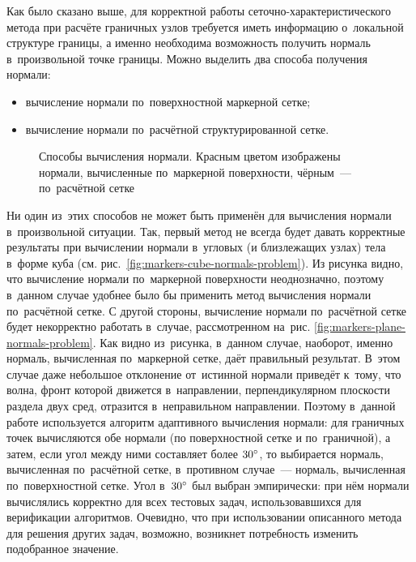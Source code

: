 \documentclass[thesis.tex]{subfiles}
\begin{document}
    Как было сказано выше, для корректной работы сеточно-характерис\-ти\-чес\-ко\-го метода при расчёте граничных узлов требуется
    иметь информацию о~локальной структуре границы, а именно необходима возможность получить нормаль в~произвольной точке
    границы. Можно выделить два способа получения нормали:

    \begin{itemize}
        \item вычисление нормали по~поверхностной маркерной сетке;
        \item вычисление нормали по~расчётной структурированной сетке.
    \end{itemize}

    \begin{figure}[t!]
        \centering
        \caption{Способы вычисления нормали. Красным цветом изображены нормали, вычисленные по~маркерной
                 поверхности, чёрным~--- по~расчётной сетке}
        \label{fig:markers-normals-problem}
    \end{figure}

    \newpage
    Ни один из~этих способов не может быть применён для вычисления нормали в~произвольной ситуации. Так, первый метод не
    всегда будет давать корректные результаты при вычислении нормали в~угловых (и близлежащих узлах) тела в~форме куба
    (см. рис.~\ref{fig:markers-cube-normals-problem}). Из рисунка видно, что вычисление нормали по~маркерной поверхности
    неоднозначно, поэтому в~данном случае удобнее было бы применить метод вычисления нормали по~расчётной сетке. С
    другой стороны, вычисление нормали по~расчётной сетке будет некорректно работать в~случае, рассмотренном на~рис.
    \ref{fig:markers-plane-normals-problem}. Как видно из~рисунка, в~данном случае, наоборот, именно нормаль,
    вычисленная по~маркерной сетке, даёт правильный результат. В~этом случае даже небольшое отклонение от~истинной
    нормали приведёт к~тому, что волна, фронт которой движется в~направлении, перпендикулярном плоскости раздела двух
    сред, отразится в~неправильном направлении. Поэтому в~данной работе используется алгоритм адаптивного вычисления
    нормали: для граничных точек вычисляются обе нормали (по поверхностной сетке и по~граничной), а затем, если угол
    между ними составляет более $30\degree$, то выбирается нормаль, вычисленная по~расчётной сетке, в~противном случае~---
    нормаль, вычисленная по~поверхностной сетке. Угол в~$30\degree$ был выбран эмпирически: при нём нормали
    вычислялись корректно для всех тестовых задач, использовавшихся для верификации алгоритмов. Очевидно, что при
    использовании описанного метода для решения других задач, возможно, возникнет потребность изменить подобранное
    значение.
\end{document}
